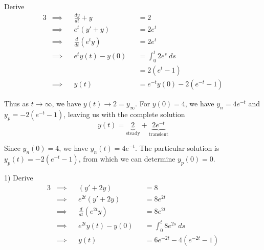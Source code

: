 \documentclass[a4paper]{article}
\begin{document}
Derive
\begin{alignat*}{3}
	&\implies && \frac{dy}{dt} + y && = 2 \\
	&\implies && e^{t} \!\left( y' + y \right) && = 2e^{t} \\
	&\implies && \frac{d }{d t} \!\left( e^{t} y \right) && = 2e^{t} \\
	&\implies && e^{t} y \!\left( t \right) - y \!\left( 0 \right) && = \int^{t}_{0} 2e^{s} \ ds \\
	& && && = 2 \!\left( e^{t} - 1 \right) \\
	&\implies && y \!\left( t \right) && = e^{-t} y \!\left( 0 \right) - 2 \!\left( e^{-t} - 1 \right) 
\end{alignat*}

Thus as \(t \rightarrow \infty\), we have \(y \!\left( t \right) \rightarrow 2 = y_{\infty}\). For \(y \!\left( 0 \right) = 4\), we have \(y_{n} = 4e^{-t}\) and \(y_{p} = -2 \!\left( e^{-t} - 1 \right) \), leaving us with the complete solution
\[
	y \!\left( t \right) = \underbrace{2}_{\text{steady}} + \underbrace{2e^{-t}}_{\text{transient}}
\]


Since \(y_{n} \!\left( 0 \right) = 4\), we have \(y_{n} \!\left( t \right) = 4e^{-t}\). The particular solution is \(y_{p} \!\left( t \right) = -2 \!\left( e^{-t} - 1 \right) \), from which we can determine \(y_{p} \!\left( 0 \right) = 0\).
\vspace{12pt}


1) Derive
\begin{alignat*}{3}
	 &\implies && \!\left( y' + 2y \right) && = 8  \\
	 &\implies && e^{2t} \!\left( y' + 2y \right) && = 8e^{2t}   \\ 
	 &\implies && \frac{d }{d t} \!\left( e^{2t}y \right) && = 8e^{2t} \\
	 &\implies && e^{2t} y \!\left( t \right) - y \!\left( 0 \right) && = \int^{t}_{0} 8e^{2s} \ ds \\
	 &\implies && y \!\left( t \right) && = 6e^{-2t} - 4 \!\left( e^{-2t} - 1 \right) 
\end{alignat*}
\end{document}
